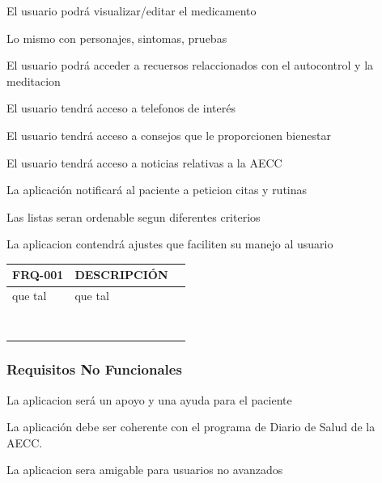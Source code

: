\documentclass[../pfc.tex]{subfiles}
\begin{document}
	El usuario podrá visualizar/editar el medicamento
	
	
	
	Lo mismo con personajes, sintomas, pruebas
	
	
	El usuario podrá acceder a recuersos relaccionados con el autocontrol y la meditacion
	
	El usuario tendrá acceso a telefonos de interés
	
	El usuario tendrá acceso a consejos que le proporcionen bienestar
	
	El usuario tendrá acceso a noticias relativas a la AECC
	
	
	
	La aplicación notificará al paciente a peticion citas y rutinas
	
	Las listas seran ordenable segun diferentes criterios
	
	La aplicacion contendrá ajustes que faciliten su manejo al usuario
	
	
	
	

	

		\begin{tabular}{|ll|l|}
			\hline \textbf{FRQ-001} & \textbf{DESCRIPCIÓN} \\
			
			\hline que tal & que tal \\ 
			\hline  &  \\ 
			\hline  &  \\ 
			\hline  &  \\ 
			\hline  &  \\ 
			\hline  &  \\ 
			\hline  &  \\ 
			\hline  &  \\ 
			\hline  &  \\ 
			\hline 
		\end{tabular} 
		
	


	\subsubsection{Requisitos No Funcionales}
	
		La aplicacion será un apoyo y una ayuda para el paciente
		
		La aplicación debe ser coherente con el programa de Diario de Salud de la AECC.
		
		La aplicacion sera amigable para usuarios no avanzados
		
\end{document}
